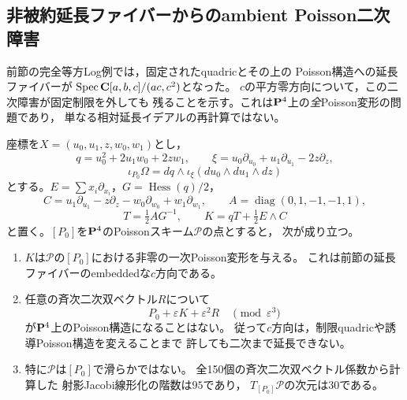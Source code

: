 \subsection{非被約延長ファイバーからのambient Poisson二次障害}
\label{subsec:quadric-ambient-second-order-obstruction}
前節の完全等方Log例では，固定されたquadricとその上の
Poisson構造への延長ファイバーが
$\operatorname{Spec}\mathbf C[a,b,c]/(ac,c^2)$となった。
$c$の平方零方向について，この二次障害が固定制限を外しても
残ることを示す。これは$\mathbf P^4$上の\emph{全}Poisson変形の問題であり，
単なる相対延長イデアルの再計算ではない。

\begin{theorem}[ambientでも消えない二次障害]
\label{thm:isotropic-ambient-second-order-obstruction}
座標を$X=(u_0,u_1,z,w_0,w_1)$とし，
\[
 q=u_0^2+2u_1w_0+2zw_1,\qquad
 \xi=u_0\partial_{u_0}+u_1\partial_{u_1}-2z\partial_z,
\]
\[
 \iota_{P_0}\Omega=dq\wedge
 \iota_\xi(du_0\wedge du_1\wedge dz)
\]
とする。$E=\sum x_i\partial_{x_i}$，$G=\operatorname{Hess}(q)/2$，
\[
 C=u_1\partial_{u_1}-z\partial_z-w_0\partial_{w_0}
 +w_1\partial_{w_1},\qquad
 A=\operatorname{diag}(0,1,-1,-1,1),
\]
\[
 T=\tfrac12 AG^{-1},\qquad
 K=qT+\tfrac12 E\wedge C
\]
と置く。$[P_0]$を$\mathbf P^4$のPoissonスキーム$\mathcal P$の点とすると，
次が成り立つ。
\begin{enumerate}
\item $K$は$\mathcal P$の$[P_0]$における非零の一次Poisson変形を与える。
これは前節の延長ファイバーのembeddedな$c$方向である。
\item 任意の斉次二次双ベクトル$R$について
\[
 P_0+\varepsilon K+\varepsilon^2R
 \quad\pmod{\varepsilon^3}
\]
が$\mathbf P^4$上のPoisson構造になることはない。
従って$c$方向は，制限quadricや誘導Poisson構造を変えることまで
許しても二次まで延長できない。
\item 特に$\mathcal P$は$[P_0]$で滑らかではない。
全150個の斉次二次双ベクトル係数から計算した
射影Jacobi線形化の階数は$95$であり，
$T_{[P_0]}\mathcal P$の次元は$30$である。
\end{enumerate}
\end{theorem}
